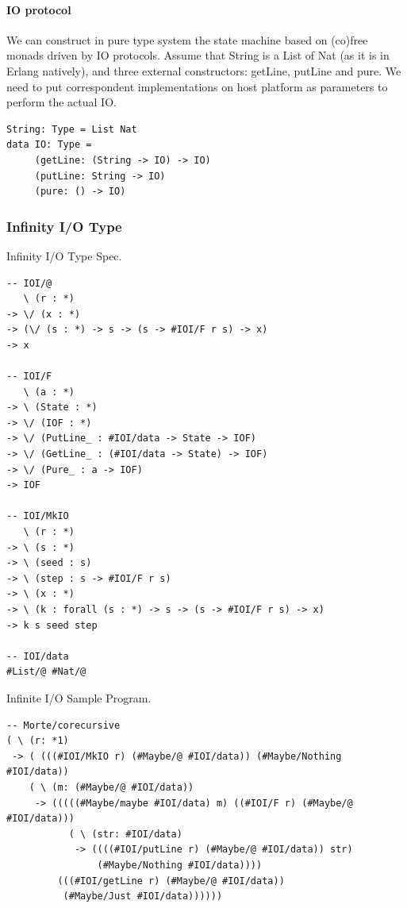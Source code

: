 \documentclass[11pt,oneside]{article}
\begin{document}
\paragraph{IO protocol}
We can construct in pure type system the state machine based on (co)free
monads driven by IO protocols. Assume that String is a List of Nat (as it is in Erlang natively),
and three external constructors: getLine, putLine and pure. We need to
put correspondent implementations on host platform as parameters to perform the actual IO.

\begin{lstlisting}[mathescape=true]
String: Type = List Nat
data IO: Type =
     (getLine: (String -> IO) -> IO)
     (putLine: String -> IO)
     (pure: () -> IO)
\end{lstlisting}

\subsubsection{Infinity I/O Type}

Infinity I/O Type Spec.

\begin{lstlisting}[mathescape=true]
-- IOI/@
   \ (r : *)
-> \/ (x : *)
-> (\/ (s : *) -> s -> (s -> #IOI/F r s) -> x)
-> x

-- IOI/F
   \ (a : *)
-> \ (State : *)
-> \/ (IOF : *)
-> \/ (PutLine_ : #IOI/data -> State -> IOF)
-> \/ (GetLine_ : (#IOI/data -> State) -> IOF)
-> \/ (Pure_ : a -> IOF)
-> IOF

-- IOI/MkIO
   \ (r : *)
-> \ (s : *)
-> \ (seed : s)
-> \ (step : s -> #IOI/F r s)
-> \ (x : *)
-> \ (k : forall (s : *) -> s -> (s -> #IOI/F r s) -> x)
-> k s seed step

-- IOI/data
#List/@ #Nat/@
\end{lstlisting}

\newpage
Infinite I/O Sample Program.

\begin{lstlisting}[mathescape=true]
-- Morte/corecursive
( \ (r: *1)
 -> ( (((#IOI/MkIO r) (#Maybe/@ #IOI/data)) (#Maybe/Nothing #IOI/data))
    ( \ (m: (#Maybe/@ #IOI/data))
     -> (((((#Maybe/maybe #IOI/data) m) ((#IOI/F r) (#Maybe/@ #IOI/data)))
           ( \ (str: #IOI/data)
            -> ((((#IOI/putLine r) (#Maybe/@ #IOI/data)) str)
                (#Maybe/Nothing #IOI/data))))
         (((#IOI/getLine r) (#Maybe/@ #IOI/data))
          (#Maybe/Just #IOI/data))))))
\end{lstlisting}
\end{document}
